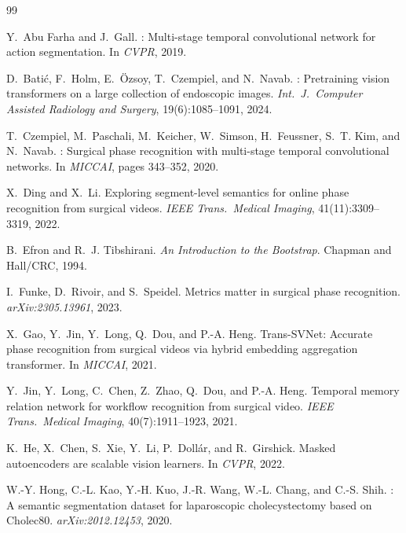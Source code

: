 \documentclass[10pt,twocolumn]{article}
\begin{document}
\begin{thebibliography}{99}
\footnotesize

Y.~Abu Farha and J.~Gall.
: Multi-stage temporal convolutional network for action
  segmentation.
\newblock In \emph{CVPR}, 2019.

D.~Bati\'c, F.~Holm, E.~\"Ozsoy, T.~Czempiel, and N.~Navab.
: Pretraining vision transformers on a large collection of
  endoscopic images.
\newblock \emph{Int.\ J.\ Computer Assisted Radiology and Surgery},
  19(6):1085--1091, 2024.

T.~Czempiel, M.~Paschali, M.~Keicher, W.~Simson, H.~Feussner, S.~T. Kim, and
  N.~Navab.
: Surgical phase recognition with multi-stage temporal
  convolutional networks.
\newblock In \emph{MICCAI}, pages 343--352, 2020.

X.~Ding and X.~Li.
\newblock Exploring segment-level semantics for online phase recognition from
  surgical videos.
\newblock \emph{IEEE Trans.\ Medical Imaging}, 41(11):3309--3319, 2022.

B.~Efron and R.~J. Tibshirani.
\newblock \emph{An Introduction to the Bootstrap}.
\newblock Chapman and Hall/CRC, 1994.

I.~Funke, D.~Rivoir, and S.~Speidel.
\newblock Metrics matter in surgical phase recognition.
\newblock \emph{arXiv:2305.13961}, 2023.

X.~Gao, Y.~Jin, Y.~Long, Q.~Dou, and P.-A. Heng.
\newblock Trans-{SVNet}: Accurate phase recognition from surgical videos via
  hybrid embedding aggregation transformer.
\newblock In \emph{MICCAI}, 2021.

Y.~Jin, Y.~Long, C.~Chen, Z.~Zhao, Q.~Dou, and P.-A. Heng.
\newblock Temporal memory relation network for workflow recognition from
  surgical video.
\newblock \emph{IEEE Trans.\ Medical Imaging}, 40(7):1911--1923, 2021.

K.~He, X.~Chen, S.~Xie, Y.~Li, P.~Doll\'ar, and R.~Girshick.
\newblock Masked autoencoders are scalable vision learners.
\newblock In \emph{CVPR}, 2022.

W.-Y. Hong, C.-L. Kao, Y.-H. Kuo, J.-R. Wang, W.-L. Chang, and C.-S. Shih.
: A semantic segmentation dataset for laparoscopic
  cholecystectomy based on {Cholec80}.
\newblock \emph{arXiv:2012.12453}, 2020.


\end{thebibliography}
\end{document}
